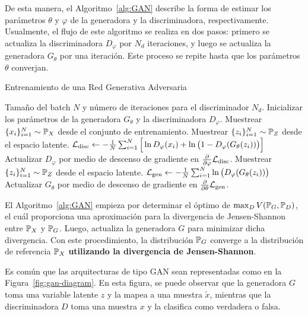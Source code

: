 De esta manera, el Algoritmo~\ref*{alg:GAN} describe la forma de estimar los parámetros $\theta$ y $\varphi$ de la generadora y la discriminadora, respectivamente. Usualmente, el flujo de este algoritmo se realiza en dos pasos: primero se actualiza la discriminadora $D_\varphi$ por $N_d$ iteraciones, y luego se actualiza la generadora $G_\theta$ por una iteración. Este proceso se repite hasta que los parámetros $\theta$ converjan.

\begin{algorithm}[H]
	\caption{Entrenamiento de una Red Generativa Adversaria}\label{alg:GAN}
	\begin{algorithmic}[1]
		\Require Tamaño del batch $N$ y número de iteraciones para el discriminador $N_d$.
		\State Inicializar los parámetros de la generadora $G_\theta$ y la discriminadora $D_\varphi$.
		\State Muestrear $\{x_i\}_{i=1}^{N} \sim \Prob_X$ desde el conjunto de entrenamiento.
		\State Muestrear $\{z_i\}_{i=1}^{N} \sim \Prob_Z$ desde el espacio latente.
		\State $\cL_{\mathrm{disc}} \gets -\frac{1}{N}\sum_{i=1}^{N} \Big[ \ln D_\varphi(x_i) + \ln \qty\big(1 - D_\varphi(G_\theta(z_i))) \Big]$
		\State Actualizar $D_\varphi$ por medio de descenso de gradiente en $\pdv{\varphi} \cL_{\mathrm{disc}}$.
		\EndFor
		\State Muestrear $\{z_i\}_{i=1}^{N} \sim \Prob_Z$ desde el espacio latente.
		\State $\cL_{\mathrm{gen}} \gets - \frac{1}{N}\sum_{i=1}^{N} \ln \qty\big(D_\varphi(G_\theta(z_i)))$
		\State Actualizar $G_\theta$ por medio de descenso de gradiente en $\pdv{\theta} \mathcal{L}_{\mathrm{gen}}$.
		\EndWhile
	\end{algorithmic}
\end{algorithm}

\begin{remark}
	El Algoritmo~\ref{alg:GAN} empieza por determinar el óptimo de $\max_D V( \Prob_G , \Prob_D )$, el cuál proporciona una aproximación para la divergencia de Jensen-Shannon entre $\Prob_X$ y $\Prob_G$. Luego, actualiza la generadora $G$ para minimizar dicha divergencia. Con este procedimiento, la distribución $\Prob_G$ converge a la distribución de referencia $\Prob_X$ \textbf{utilizando la divergencia de Jensen-Shannon}.
\end{remark}

Es común que las arquitecturas de tipo GAN sean representadas como en la Figura~\ref{fig:gan-diagram}. En esta figura, se puede observar que la generadora $G$ toma una variable latente $z$ y la mapea a una muestra $\tilde x$, mientras que la discriminadora $D$ toma una muestra $x$ y la clasifica como verdadera o falsa.

